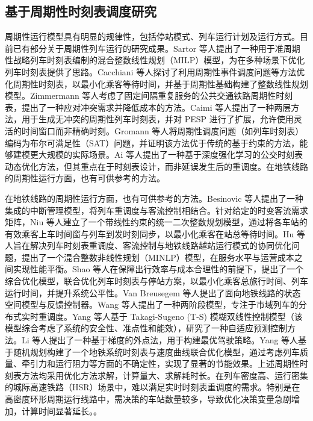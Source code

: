 \subsection{基于周期性时刻表调度研究}
周期性运行模型具有明显的规律性，包括停站模式、列车运行计划及运行方式。目前已有部分关于周期性列车运行的研究成果。Sartor 等人\cite{Sartor2023}提出了一种用于准周期性战略列车时刻表编制的混合整数线性规划（MILP）模型，为在多种场景下优化列车时刻表提供了思路。Cacchiani 等人\cite{Cacchiani2012}探讨了利用周期性事件调度问题等方法优化周期性时刻表，以最小化乘客等待时间，并基于周期性基础构建了整数线性规划模型。Zimmermann 等人\cite{Zimmermann2003}考虑了固定间隔重复服务的公共交通铁路周期性时刻表，提出了一种应对冲突需求并降低成本的方法。Caimi 等人\cite{Caimi2011}提出了一种两层方法，用于生成无冲突的周期性列车时刻表，并对 PESP 进行了扩展，允许使用灵活的时间窗口而非精确时刻。Gromann 等人\cite{Gromann2012}将周期性调度问题（如列车时刻表）编码为布尔可满足性（SAT）问题，并证明该方法优于传统的基于约束的方法，能够建模更大规模的实际场景。Ai 等人\cite{Ai2022}提出了一种基于深度强化学习的公交时刻表动态优化方法，但其重点在于时刻表设计，而非延误发生后的重调度。在地铁线路的周期性运行方面，也有可供参考的方法。

在地铁线路的周期性运行方面，也有可供参考的方法。Besinovic 等人\cite{Besinovic2022}提出了一种集成的中断管理模型，将列车重调度与客流控制相结合。针对给定的时变客流需求矩阵，Niu 等人\cite{Niu2015}建立了一个带线性约束的统一二次整数规划模型，通过将各车站的有效乘客上车时间窗与列车到发时刻同步，以最小化乘客在站总等待时间。Hu 等人\cite{Hu2023}旨在解决列车时刻表重调度、客流控制与地铁线路越站运行模式的协同优化问题，提出了一个混合整数非线性规划（MINLP）模型，在服务水平与运营成本之间实现性能平衡。Shao 等人\cite{Shao2022}在保障出行效率与成本合理性的前提下，提出了一个综合优化模型，联合优化列车时刻表与停站方案，以最小化乘客总旅行时间、列车运行时间，并提升系统公平性。Van Breusegem 等人\cite{VanBreusegem1991}提出了面向地铁线路的状态空间模型与反馈控制器。Wang 等人\cite{Wang2022}提出了一种两阶段模型，专注于市域列车的分布式实时重调度。Yang 等人\cite{Yang2016a}基于 Takagi-Sugeno (T-S) 模糊双线性控制模型（该模型综合考虑了系统的安全性、准点性和能效），研究了一种自适应预测控制方法。Li 等人\cite{Li2013}提出了一种基于梯度的外点法，用于构建最优驾驶策略。Yang 等人\cite{Yang2016}基于随机规划构建了一个地铁系统时刻表与速度曲线联合优化模型，通过考虑列车质量、牵引力和运行阻力等方面的不确定性，实现了显著的节能效果。上述周期性时刻表方法均采用优化方法求解，计算量大、求解耗时长。在列车密度高、运行密集的城际高速铁路（HSR）场景中，难以满足实时时刻表重调度的需求。特别是在高密度环形周期运行线路中，需决策的车站数量较多，导致优化决策变量急剧增加，计算时间显著延长。。

